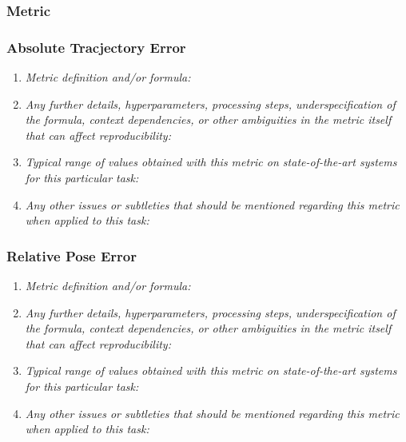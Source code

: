 \documentclass[a4paper,11pt]{article}
\begin{document}
        \subsubsection{Metric}
            \subsubsection{Absolute Tracjectory Error}
                \begin{enumerate}[label=\alph*.]
                    \item \textit{Metric definition and/or formula:}
                    \bigskip
                    \item \textit{Any further details, hyperparameters, processing steps, underspecification of the formula, context dependencies, or other ambiguities in the metric itself that can affect reproducibility:}
                    \bigskip
                    \item \textit{Typical range of values obtained with this metric on state-of-the-art systems for this particular task:}
                    \bigskip
                    \item \textit{Any other issues or subtleties that should be mentioned regarding this metric when applied to this task:}
                    \bigskip
                \end{enumerate}
        \subsubsection{Relative Pose Error}
            \begin{enumerate}[label=\alph*.]
                \item \textit{Metric definition and/or formula:}
                \bigskip
                \item \textit{Any further details, hyperparameters, processing steps, underspecification of the formula, context dependencies, or other ambiguities in the metric itself that can affect reproducibility:}
                \bigskip
                \item \textit{Typical range of values obtained with this metric on state-of-the-art systems for this particular task:}
                \bigskip
                \item \textit{Any other issues or subtleties that should be mentioned regarding this metric when applied to this task:}
                \bigskip
            \end{enumerate}
\end{document}
